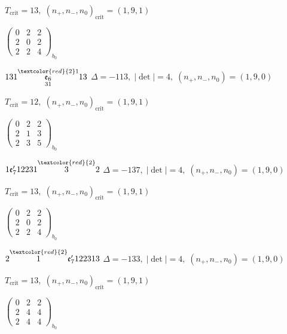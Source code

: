 \documentclass[10pt]{article}
\begin{document}
\hspace{1em}$T_{\text{crit}}=13,\; (n_+,n_-,n_0)_{\text{crit}}=(1,9,1)$

\hspace{2em}$\left(\begin{smallmatrix}0 & 2 & 2 \\ 2 & 0 & 2 \\ 2 & 2 & 4\end{smallmatrix}\right)_{\!b_0}$

$131\overset{\textcolor{red}{2}1}{\underset{31}{\mathfrak{e}_6}}13$ \quad $\Delta=-113,\; |\det|=4,\; (n_+,n_-,n_0)=(1,9,0)$

\hspace{1em}$T_{\text{crit}}=12,\; (n_+,n_-,n_0)_{\text{crit}}=(1,9,1)$

\hspace{2em}$\left(\begin{smallmatrix}0 & 2 & 2 \\ 2 & 1 & 3 \\ 2 & 3 & 5\end{smallmatrix}\right)_{\!b_0}$

\smallskip

$1\mathfrak{e}_7'12231\overset{\textcolor{red}{2}}{3}2$ \quad $\Delta=-137,\; |\det|=4,\; (n_+,n_-,n_0)=(1,9,0)$

\hspace{1em}$T_{\text{crit}}=13,\; (n_+,n_-,n_0)_{\text{crit}}=(1,9,1)$

\hspace{2em}$\left(\begin{smallmatrix}0 & 2 & 2 \\ 2 & 0 & 2 \\ 2 & 2 & 4\end{smallmatrix}\right)_{\!b_0}$

\smallskip

$2\overset{\textcolor{red}{2}}{1}\mathfrak{e}_7'122313$ \quad $\Delta=-133,\; |\det|=4,\; (n_+,n_-,n_0)=(1,9,0)$

\hspace{1em}$T_{\text{crit}}=13,\; (n_+,n_-,n_0)_{\text{crit}}=(1,9,1)$

\hspace{2em}$\left(\begin{smallmatrix}0 & 2 & 2 \\ 2 & 4 & 4 \\ 2 & 4 & 4\end{smallmatrix}\right)_{\!b_0}$
\end{document}

